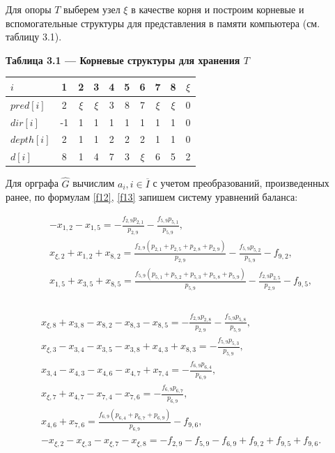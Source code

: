 \documentclass[14pt]{extarticle}%
\begin{document}
Для опоры $T$ выберем узел $\xi$ в качестве корня и построим корневые и вспомогательные структуры для представления в памяти компьютера (см. таблицу 3.1).

\begin{center}
\textbf{Таблица 3.1 --- Корневые структуры для хранения $T$}\\
\begin{tabular}{l|ccccccccc}
 $i$ &1&2&3&4&5&6&7&8&$\xi$\\\hline
 $pred[i]$&2 & $\xi$ & $\xi$ & 3 & 8 & 7 & $\xi$ & $\xi$ & 0 \\
 $dir[i]$& -1 & 1 & 1 & 1 & 1 & 1 & 1 & 1 & 0 \\
 $depth[i]$&2 & 1 & 1 & 2 & 2 & 2 & 1 & 1 & 0 \\
 $d[i]$&8 & 1 & 4 & 7 & 3 & $\xi$ & 6 & 5 & 2 \\
\end{tabular}
\end{center}

Для орграфа $\widehat{G}$ вычислим $a_i, i\in \overline{I}$ с учетом преобразований, произведенных ранее, по формулам \eqref{f12}, \eqref{f13} запишем систему уравнений баланса:

\begin{equation*}\begin{gathered}
	    -x_{1,2}-x_{1,5}=-\frac{f_{2,9} p_{2,1}}{p_{2,9}}-\frac{f_{5,9} p_{5,1}}{p_{5,9}},\\
    x_{\xi ,2}+x_{1,2}+x_{8,2}=\frac{f_{2,9} \left(p_{2,1}+p_{2,5}+p_{2,8}+p_{2,9}\right)}{p_{2,9}}-\frac{f_{5,9} p_{5,2}}{p_{5,9}}-f_{9,2},\\
    x_{1,5}+x_{3,5}+x_{8,5}=\frac{f_{5,9} \left(p_{5,1}+p_{5,2}+p_{5,3}+p_{5,8}+p_{5,9}\right)}{p_{5,9}}-\frac{f_{2,9} p_{2,5}}{p_{2,9}}-f_{9,5},\\
    \end{gathered}
    \end{equation*}\\
    \begin{equation}\label{f3.1.1}
    \begin{gathered}
    x_{\xi ,8}+x_{3,8}-x_{8,2}-x_{8,3}-x_{8,5}=-\frac{f_{2,9} p_{2,8}}{p_{2,9}}-\frac{f_{5,9} p_{5,8}}{p_{5,9}},\\
    x_{\xi ,3}-x_{3,4}-x_{3,5}-x_{3,8}+x_{4,3}+x_{8,3}=-\frac{f_{5,9} p_{5,3}}{p_{5,9}},\\
    x_{3,4}-x_{4,3}-x_{4,6}-x_{4,7}+x_{7,4}=-\frac{f_{6,9} p_{6,4}}{p_{6,9}},\\
    x_{\xi ,7}+x_{4,7}-x_{7,4}-x_{7,6}=-\frac{f_{6,9} p_{6,7}}{p_{6,9}},\\
    x_{4,6}+x_{7,6}=\frac{f_{6,9} \left(p_{6,4}+p_{6,7}+p_{6,9}\right)}{p_{6,9}}-f_{9,6},\\
    -x_{\xi ,2}-x_{\xi ,3}-x_{\xi ,7}-x_{\xi ,8}=-f_{2,9}-f_{5,9}-f_{6,9}+f_{9,2}+f_{9,5}+f_{9,6}.
    \end{gathered}
\end{equation}
\end{document}
